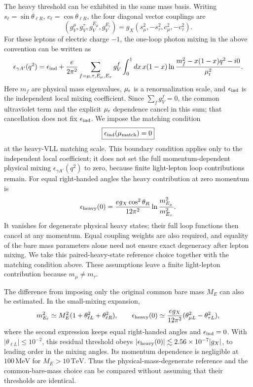 \documentclass[12pt,a4paper]{article}
\begin{document}
The heavy threshold can be exhibited in the same mass basis. Writing \(s_\ell=\sin\theta_{\ell R}\), \(c_\ell=\cos\theta_{\ell R}\), the four diagonal vector couplings are
\[
(g_V^\mu,g_V^\tau,g_V^{E_\mu},g_V^{E_\tau})
=g_X(s_\mu^2,-s_\tau^2,c_\mu^2,-c_\tau^2).
\]
For these leptons of electric charge \(-1\), the one-loop photon mixing in the above convention can be written as
\[
\epsilon_{\gamma A'}(q^2)=\epsilon_{\rm ind}
+\frac{e}{2\pi^2}\sum_{f=\mu,\tau,E_\mu,E_\tau}g_V^f
\int_0^1dx\,x(1-x)
\ln\frac{m_f^2-x(1-x)q^2-i0}{\mu_{\rm r}^2}.
\]
Here \(m_f\) are physical mass eigenvalues, \(\mu_{\rm r}\) is a renormalization scale, and \(\epsilon_{\rm ind}\) is the independent local mixing coefficient. Since \(\sum_f g_V^f=0\), the common ultraviolet term and the explicit \(\mu_{\rm r}\) dependence cancel in this sum; that cancellation does not fix \(\epsilon_{\rm ind}\). We impose the matching condition
\[
\boxed{\epsilon_{\rm ind}(\mu_{\rm match})=0}
\]
at the heavy-VLL matching scale. This boundary condition applies only to the independent local coefficient; it does not set the full momentum-dependent physical mixing \(\epsilon_{\gamma A'}(q^2)\) to zero, because finite light-lepton loop contributions remain. For equal right-handed angles the heavy contribution at zero momentum is
\[
\epsilon_{\rm heavy}(0)=\frac{eg_X\cos^2\theta_R}{12\pi^2}
\ln\frac{m_{E_\mu}^2}{m_{E_\tau}^2}.
\]
It vanishes for degenerate physical heavy states; their full loop functions then cancel at any momentum. Equal coupling weights are also required, and equality of the bare mass parameters alone need not ensure exact degeneracy after lepton mixing. We take this paired-heavy-state reference choice together with the matching condition above. These assumptions leave a finite light-lepton contribution because \(m_\mu\ne m_\tau\).

The difference from imposing only the original common bare mass \(M_E\) can also be estimated. In the small-mixing expansion,
\[
m_{E_\ell}^2\simeq M_E^2(1+\theta_{\ell L}^2+\theta_{\ell R}^2),
\qquad
\epsilon_{\rm heavy}(0)\simeq\frac{eg_X}{12\pi^2}
(\theta_{\mu L}^2-\theta_{\tau L}^2),
\]
where the second expression keeps equal right-handed angles and \(\epsilon_{\rm ind}=0\). With \(|\theta_{\ell L}|\leq10^{-2}\), this residual threshold obeys \(|\epsilon_{\rm heavy}(0)|\lesssim2.56\times10^{-7}|g_X|\), to leading order in the mixing angles. Its momentum dependence is negligible at \(100\,\mathrm{MeV}\) for \(M_E>10\,\mathrm{TeV}\). Thus the physical-mass-degenerate reference and the common-bare-mass choice can be compared without assuming that their thresholds are identical.
\end{document}
